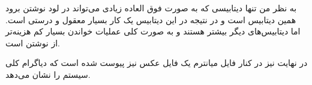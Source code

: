 به نظر من تنها دیتابیسی که به صورت فوق العاده زیادی می‌تواند در لود نوشتن برود همین دیتابیس است
و در نتیجه
در این دیتابیس یک کار بسیار معقول و درستی است. اما دیتابیس‌های دیگر بیشتر
هستند و به صورت کلی عملیات خواندن بسیار کم هزینه‌تر از نوشتن است.

در نهایت نیز در کنار فایل میانترم یک فایل عکس نیز پیوست شده است که دیاگرام کلی سیستم را نشان می‌دهد.